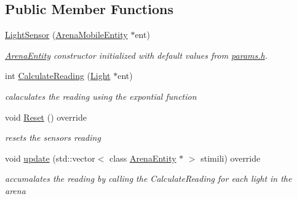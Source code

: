 \subsection*{Public Member Functions}
\begin{DoxyCompactItemize}
\item 
\hyperlink{classLightSensor_ac99ce134fee5ee22775a8d5a6531d02b}{Light\+Sensor} (\hyperlink{classArenaMobileEntity}{Arena\+Mobile\+Entity} $\ast$ent)\hypertarget{classLightSensor_ac99ce134fee5ee22775a8d5a6531d02b}{}\label{classLightSensor_ac99ce134fee5ee22775a8d5a6531d02b}

\begin{DoxyCompactList}\small\item\em \hyperlink{classArenaEntity}{Arena\+Entity} constructor initialized with default values from \hyperlink{params_8h}{params.\+h}. \end{DoxyCompactList}\item 
int \hyperlink{classLightSensor_abcd9b14b4c09ed48d09eddd72943f898}{Calculate\+Reading} (\hyperlink{classLight}{Light} $\ast$ent)\hypertarget{classLightSensor_abcd9b14b4c09ed48d09eddd72943f898}{}\label{classLightSensor_abcd9b14b4c09ed48d09eddd72943f898}

\begin{DoxyCompactList}\small\item\em calaculates the reading using the expontial function \end{DoxyCompactList}\item 
void \hyperlink{classLightSensor_a8b8643f10dc619dd8f31ab87034a04f6}{Reset} () override\hypertarget{classLightSensor_a8b8643f10dc619dd8f31ab87034a04f6}{}\label{classLightSensor_a8b8643f10dc619dd8f31ab87034a04f6}

\begin{DoxyCompactList}\small\item\em resets the sensors reading \end{DoxyCompactList}\item 
void \hyperlink{classLightSensor_acf1befd5d67f95bebf3a12f9e3abe93a}{update} (std\+::vector$<$ class \hyperlink{classArenaEntity}{Arena\+Entity} $\ast$ $>$ stimili) override\hypertarget{classLightSensor_acf1befd5d67f95bebf3a12f9e3abe93a}{}\label{classLightSensor_acf1befd5d67f95bebf3a12f9e3abe93a}

\begin{DoxyCompactList}\small\item\em accumalates the reading by calling the Calculate\+Reading for each light in the arena \end{DoxyCompactList}\end{DoxyCompactItemize}
